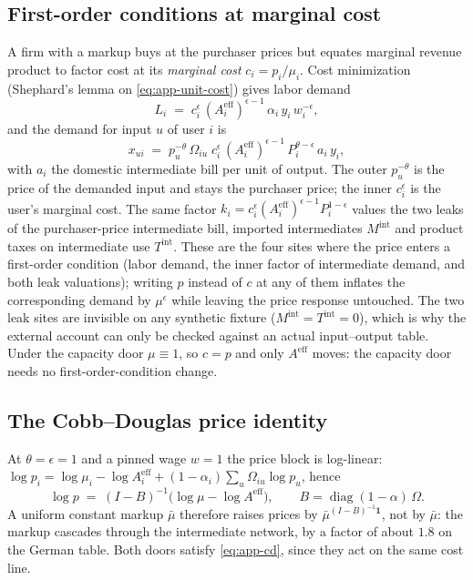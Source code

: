 \subsection{First-order conditions at marginal cost}\label{app:pricing-foc}
A firm with a markup buys at the purchaser prices but equates marginal revenue
product to factor cost at its \emph{marginal cost} $c_i = p_i/\mu_i$. Cost
minimization (Shephard's lemma on \eqref{eq:app-unit-cost}) gives labor demand
\begin{equation}\label{eq:app-labour}
  L_i \;=\; c_i^{\epsilon}\,(A^{\mathrm{eff}}_i)^{\epsilon-1}\,\alpha_i\,y_i\,w_i^{-\epsilon},
\end{equation}
and the demand for input $u$ of user $i$ is
\begin{equation}\label{eq:app-intermediate}
  x_{ui} \;=\; p_u^{-\theta}\,\Omega_{iu}\;
     c_i^{\epsilon}\,(A^{\mathrm{eff}}_i)^{\epsilon-1}\,P_i^{\theta-\epsilon}\,a_i\,y_i ,
\end{equation}
with $a_i$ the domestic intermediate bill per unit of output. The outer
$p_u^{-\theta}$ is the price of the demanded input and stays the purchaser
price; the inner $c_i^{\epsilon}$ is the user's marginal cost. The same factor
$k_i = c_i^{\epsilon}(A^{\mathrm{eff}}_i)^{\epsilon-1}P_i^{1-\epsilon}$ values
the two leaks of the purchaser-price intermediate bill, imported
intermediates $M^{\mathrm{int}}$ and product taxes on intermediate use
$T^{\mathrm{int}}$. These are the four sites where the price enters a
first-order condition (labor demand, the inner factor of intermediate demand,
and both leak valuations); writing $p$ instead of $c$ at any of them inflates
the corresponding demand by $\mu^{\epsilon}$ while leaving the price response
untouched. The two leak sites are invisible on any synthetic fixture
($M^{\mathrm{int}} = T^{\mathrm{int}} = 0$), which is why the external account can only be checked
against an actual input--output table. Under the capacity door
$\mu \equiv 1$, so $c = p$ and only $A^{\mathrm{eff}}$ moves: the capacity door
needs no first-order-condition change.

\subsection{The Cobb--Douglas price identity}\label{app:pricing-cd}
At $\theta = \epsilon = 1$ and a pinned wage $w = 1$ the price block is
log-linear: $\log p_i = \log \mu_i - \log A^{\mathrm{eff}}_i
+ (1-\alpha_i)\sum_u \Omega_{iu}\log p_u$, hence
\begin{equation}\label{eq:app-cd}
  \log p \;=\; (I - B)^{-1}\bigl(\log \mu - \log A^{\mathrm{eff}}\bigr),
  \qquad B = \operatorname{diag}(1-\alpha)\,\Omega .
\end{equation}
A uniform constant markup $\bar\mu$ therefore raises prices by
$\bar\mu^{(I-B)^{-1}\mathbf 1}$, not by $\bar\mu$: the markup cascades through
the intermediate network, by a factor of about $1.8$ on the German table. Both doors satisfy \eqref{eq:app-cd}, since they act on
the same cost line.

